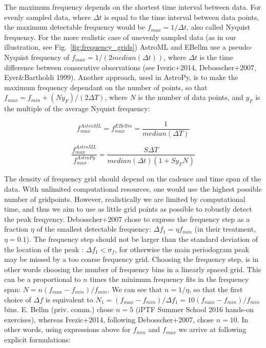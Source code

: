 \documentclass[fleqn,usenatbib]{mnras}  %
\begin{document}
The maximum frequency depends on the shortest time interval between data.  For evenly sampled data,  where $\Delta t$ is equal to the time interval between data points, the maximum detectable frequency would be $f_{max} = 1 / \Delta t$, also called Nyquist frequency. 
For the more realistic case of unevenly sampled data (as in our illustration, see Fig.~\ref{fig:frequency_grids}) AstroML and EBellm use a pseudo-Nyquist frequency of $f_{max} = 1 / (2 median(\Delta t))$, where $\Delta t $ is the time difference between consecutive observations (see Ivezic+2014,  Debosscher+2007, Eyer\&Bartholdi 1999). Another approach, used in AstroPy, is to make the maximum frequency dependant on the number of points, so that $f_{max} = f_{min} + (N y_{F}) / (2 \Delta T)$, where $N$ is the number of data points, and $y_{F}$ is the  multiple of the average Nyquist frequency: 

\begin{equation}
f_{max}^{AstroML} = f_{max}^{EBellm} = \frac{1}{median(\Delta T)}
\end{equation}

\begin{equation}
\frac{f_{max}^{AstroML}}{f_{max}^{AstroPy}} = \frac{S \Delta T }{median(\Delta t) (1 + S y_{F} N)}
\end{equation}


The density of frequency grid should depend on the cadence and time span of the data. With unlimited computational resources, one would use the highest possible number of gridpoints.   However, realistically we are limited by computational time, and thus we aim to use as little grid points as possible to robustly detect the peak freqyency.  Debosscher+2007 chose to express the frequency step as a fraction $\eta$ of the smallest detectable frequency: $\Delta f_{1} = \eta f_{min}$ (in their treatment, $\eta = 0.1$). The frequency step should not be larger than the standard deviation of the location of the peak : $\Delta f_{1} < \sigma_{f}$, for otherwise the main periodogram peak may be missed by a too coarse frequency grid.  
Choosing the frequency step, is in other words choosing the number of frequency bins in a linearly spaced grid.
This can be a proportional to $n$ times the minimum frequency fits in the frequency span:  $N = n (f_{max} - f_{min}) / f_{min}$. We can see that $n = 1 / \eta$, so that the first choice of $\Delta f$ is equivalent to $N_{1} = (f_{max} - f_{min}) / \Delta f_{1} = 10 (f_{max} - f_{min}) / f_{min}$ bins. E. Bellm (priv. comm.) chose $n=5$ (iPTF Summer School 2016 hands-on exercises), whereas Ivezic+2014, following Debosscher+2007, chose $n=10$.  In other words, using expressions above for $f_{min}$ and $f_{max}$ we arrive at following explicit formulations: 
\end{document}
